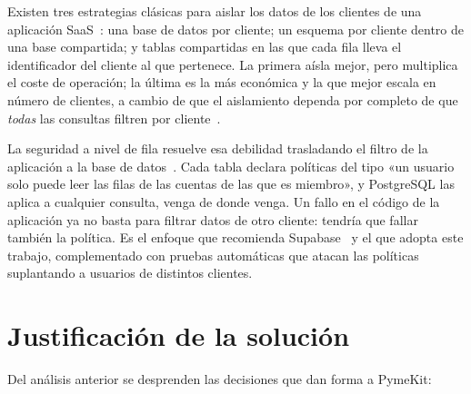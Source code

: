 Existen tres estrategias clásicas para aislar los datos de los clientes de una
aplicación SaaS~\cite{chong2006multitenant}: una base de datos por cliente; un
esquema por cliente dentro de una base compartida; y tablas compartidas en las
que cada fila lleva el identificador del cliente al que pertenece. La primera
aísla mejor, pero multiplica el coste de operación; la última es la más
económica y la que mejor escala en número de clientes, a cambio de que el
aislamiento dependa por completo de que \emph{todas} las consultas filtren por
cliente~\cite{krebs2012multitenancy}.

La seguridad a nivel de fila resuelve esa debilidad trasladando el filtro de
la aplicación a la base de datos~\cite{postgresql-rls,postgresql-createpolicy}.
Cada tabla declara políticas del tipo «un usuario solo puede leer las filas de
las cuentas de las que es miembro», y PostgreSQL las aplica a cualquier
consulta, venga de donde venga. Un fallo en el código de la aplicación ya no
basta para filtrar datos de otro cliente: tendría que fallar también la
política. Es el enfoque que recomienda Supabase~\cite{supabase-rls} y el que
adopta este trabajo, complementado con pruebas automáticas que atacan las
políticas suplantando a usuarios de distintos clientes.

\section{Justificación de la solución}
\label{sec:ctx-justificacion}

Del análisis anterior se desprenden las decisiones que dan forma a PymeKit:

